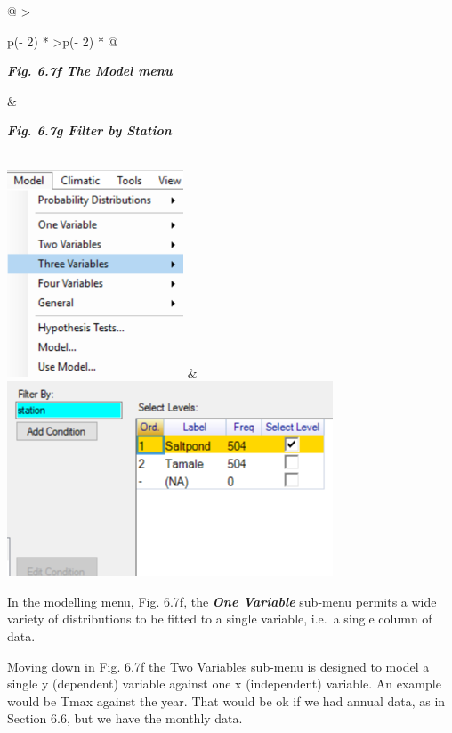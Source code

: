 \documentclass[
  letterpaper,
  DIV=11,
  numbers=noendperiod]{scrreprt}
\begin{document}
\begin{longtable}[]{@{}
  >{\raggedright\arraybackslash}p{(\columnwidth - 2\tabcolsep) * }
  >{\centering\arraybackslash}p{(\columnwidth - 2\tabcolsep) * }@{}}
\toprule\noalign{}
\begin{minipage}[b]{\linewidth}\raggedright
\textbf{\emph{Fig. 6.7f The Model menu}}
\end{minipage} & \begin{minipage}[b]{\linewidth}\centering
\textbf{\emph{Fig. 6.7g Filter by Station}}
\end{minipage} \\
\midrule\noalign{}
\endhead
\bottomrule\noalign{}
\endlastfoot
\includegraphics[width=2.06261in,height=2.42374in]{figures/Fig6.7f.png}
&
\includegraphics[width=3.8127in,height=2.28484in]{figures/Fig6.7g.png} \\
\end{longtable}

In the modelling menu, Fig. 6.7f, the \textbf{\emph{One Variable}}
sub-menu permits a wide variety of distributions to be fitted to a
single variable, i.e.~a single column of data.

Moving down in Fig. 6.7f the Two Variables sub-menu is designed to model
a single y (dependent) variable against one x (independent) variable. An
example would be Tmax against the year. That would be ok if we had
annual data, as in Section 6.6, but we have the monthly data.
\end{document}
